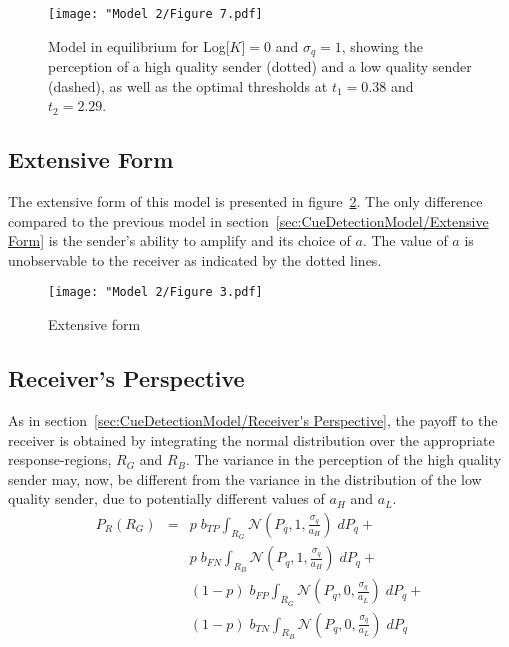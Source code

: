 \documentclass[a4paper,12pt]{article}
\numberwithin{equation}{section}
\begin{document}
\begin{figure}[h]
\captionsetup{width=360pt}
\begin{center}
\leavevmode
\texttt{[image: "Model 2/Figure 7.pdf]}
\caption{Model in equilibrium for Log[$K$]$=0$ and $\sigma_{q}=1$, showing the perception of a high quality sender (dotted) and a low quality sender (dashed), as well as the optimal thresholds at $t_{1}=0.38$ and $t_{2}=2.29$.}
\label{fig:Model 2/Figure 7.pdf}
\end{center}
\end{figure}

\newpage

\subsection{Extensive Form}
\label{sec:CueDetectionModelwithAmplification/Extensive Form}

The extensive form of this model is presented in figure~\ref{fig:Model 2/Figure 3.pdf}. The only difference compared to the previous model in section~\ref{sec:CueDetectionModel/Extensive Form} is the sender's ability to amplify and its choice of $a$. The value of $a$ is unobservable to the receiver as indicated by the dotted lines.

\begin{figure}[!h]
\begin{center}
\leavevmode
\texttt{[image: "Model 2/Figure 3.pdf]}
\caption{Extensive form}
\label{fig:Model 2/Figure 3.pdf}
\end{center}
\end{figure}


\subsection{Receiver's Perspective}
\label{sec:CueDetectionModelwithAmplification/Receiver's Perspective}

As in section~\ref{sec:CueDetectionModel/Receiver's Perspective}, the payoff to the receiver is obtained by integrating the normal distribution over the appropriate response-regions, $R_{G}$ and $R_{B}$. The variance in the perception of the high quality sender may, now, be different from the variance in the distribution of the low quality sender, due to potentially different values of $a_{H}$ and $a_{L}$.
\begin{equation}
\label{eq:CueDetectionModelwithAmplification/PayoffR}
\begin{array}{rcl}
P_{R}(R_{G}) &=& p \; b_{TP} \displaystyle \int_{R_{G}} \mathcal{N}(P_{q}, 1, \frac{\sigma_{q}}{a_{H}}) \; dP_{q} +\\
&&p \; b_{FN} \displaystyle \int_{R_{B}} \mathcal{N}(P_{q}, 1, \frac{\sigma_{q}}{a_{H}}) \; dP_{q} +\\
&&(1-p) \; b_{FP} \displaystyle \int_{R_{G}} \mathcal{N}(P_{q}, 0, \frac{\sigma_{q}}{a_{L}}) \; dP_{q} +\\
&&(1-p) \; b_{TN} \displaystyle \int_{R_{B}} \mathcal{N}(P_{q}, 0, \frac{\sigma_{q}}{a_{L}}) \; dP_{q}
\end{array}
\end{equation}
\end{document}
